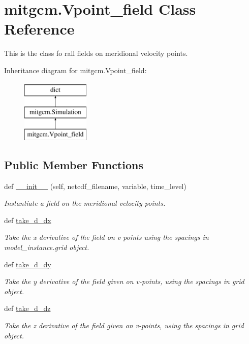 \hypertarget{classmitgcm_1_1Vpoint__field}{}\section{mitgcm.\+Vpoint\+\_\+field Class Reference}
\label{classmitgcm_1_1Vpoint__field}


This is the class fo rall fields on meridional velocity points.  


Inheritance diagram for mitgcm.\+Vpoint\+\_\+field\+:\begin{figure}[H]
\begin{center}
\leavevmode
\includegraphics[height=3.000000cm]{classmitgcm_1_1Vpoint__field}
\end{center}
\end{figure}
\subsection*{Public Member Functions}
\begin{DoxyCompactItemize}
\item 
def \hyperlink{classmitgcm_1_1Vpoint__field_adab38af8b339e86fb4fb5de769ea920f}{\+\_\+\+\_\+init\+\_\+\+\_\+} (self, netcdf\+\_\+filename, variable, time\+\_\+level)
\begin{DoxyCompactList}\small\item\em Instantiate a field on the meridional velocity points. \end{DoxyCompactList}\item 
def \hyperlink{classmitgcm_1_1Vpoint__field_a0735efcbc90505f47a507f102061f18a}{take\+\_\+d\+\_\+dx}
\begin{DoxyCompactList}\small\item\em Take the x derivative of the field on v points using the spacings in model\+\_\+instance.\+grid object. \end{DoxyCompactList}\item 
def \hyperlink{classmitgcm_1_1Vpoint__field_acaccb1a41ec42c0f60c82bf092534b94}{take\+\_\+d\+\_\+dy}
\begin{DoxyCompactList}\small\item\em Take the y derivative of the field given on v-\/points, using the spacings in grid object. \end{DoxyCompactList}\item 
def \hyperlink{classmitgcm_1_1Vpoint__field_a6d06f4b2a5e774bbc711e39ba51723ea}{take\+\_\+d\+\_\+dz}
\begin{DoxyCompactList}\small\item\em Take the z derivative of the field given on v-\/points, using the spacings in grid object. \end{DoxyCompactList}\end{DoxyCompactItemize}
